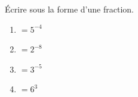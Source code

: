 \documentclass[exercice]{thedocument}%
\begin{document}
%
Écrire sous la forme d'une fraction.
\begin{enumerate}[label=\Alph*, font=\normalfont]
    \item$= 5^{-4}$
    \item$= 2^{-8}$
    \item$=3^{-5}$
    \item$=6^{3}$
\end{enumerate}
\end{document}
